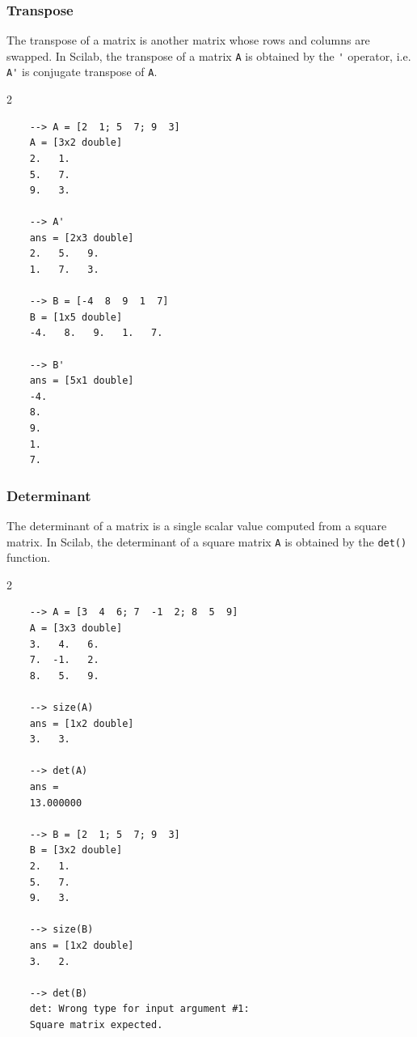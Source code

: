 \subsubsection{Transpose}
The transpose of a matrix is another matrix whose rows and columns are swapped. In Scilab, the transpose of a matrix \verb|A| is obtained by the \verb|'| operator, i.e. \verb|A'| is conjugate transpose of \verb|A|.
\begin{multicols}{2}
	\begin{verbatim}
	--> A = [2  1; 5  7; 9  3]
	A = [3x2 double]
	2.   1.
	5.   7.
	9.   3.
	
	--> A'
	ans = [2x3 double]
	2.   5.   9.
	1.   7.   3.
	
	--> B = [-4  8  9  1  7]
	B = [1x5 double]
	-4.   8.   9.   1.   7.
	
	--> B'
	ans = [5x1 double]
	-4.
	8.
	9.
	1.
	7.
	\end{verbatim}
\end{multicols}

\subsubsection{Determinant}
The determinant of a matrix is a single scalar value computed from a square matrix. In Scilab, the determinant of a square matrix \verb|A| is obtained by the \verb|det()| function.
\begin{multicols}{2}
	\begin{verbatim}
	--> A = [3  4  6; 7  -1  2; 8  5  9]
	A = [3x3 double]
	3.   4.   6.
	7.  -1.   2.
	8.   5.   9.
	
	--> size(A)
	ans = [1x2 double]
	3.   3.
	
	--> det(A)
	ans = 
	13.000000
	
	--> B = [2  1; 5  7; 9  3]
	B = [3x2 double]
	2.   1.
	5.   7.
	9.   3.
	
	--> size(B)
	ans = [1x2 double]
	3.   2.
	
	--> det(B)
	det: Wrong type for input argument #1:
	Square matrix expected.
	\end{verbatim}
\end{multicols}

